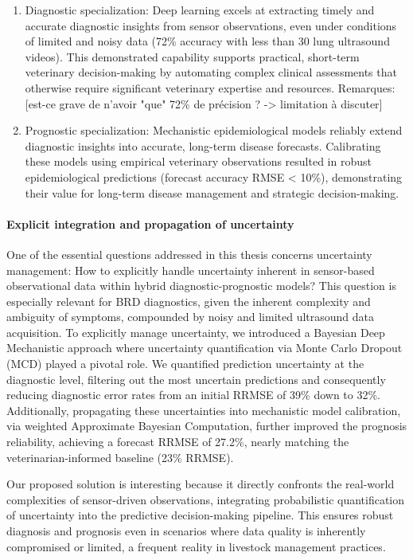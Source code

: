 \begin{enumerate}
    \item Diagnostic specialization: Deep learning excels at extracting timely and accurate diagnostic insights from sensor observations, even under conditions of limited and noisy data (72\% accuracy with less than 30 lung ultrasound videos). This demonstrated capability supports practical, short-term veterinary decision-making by automating complex clinical assessments that otherwise require significant veterinary expertise and resources. Remarques: [est-ce grave de n'avoir "que" 72\% de précision ? -> limitation à discuter]
    
    \item Prognostic specialization: Mechanistic epidemiological models reliably extend diagnostic insights into accurate, long-term disease forecasts. Calibrating these models using empirical veterinary observations resulted in robust epidemiological predictions (forecast accuracy RMSE < 10\%), demonstrating their value for long-term disease management and strategic decision-making.
\end{enumerate}

\paragraph{Explicit integration and propagation of uncertainty} One of the essential questions addressed in this thesis concerns uncertainty management: How to explicitly handle uncertainty inherent in sensor-based observational data within hybrid diagnostic-prognostic models? This question is especially relevant for BRD diagnostics, given the inherent complexity and ambiguity of symptoms, compounded by noisy and limited ultrasound data acquisition.
To explicitly manage uncertainty, we introduced a Bayesian Deep Mechanistic approach where uncertainty quantification via Monte Carlo Dropout (MCD) played a pivotal role. We quantified prediction uncertainty at the diagnostic level, filtering out the most uncertain predictions and consequently reducing diagnostic error rates from an initial RRMSE of 39\% down to 32\%. Additionally, propagating these uncertainties into mechanistic model calibration, via weighted Approximate Bayesian Computation, further improved the prognosis reliability, achieving a forecast RRMSE of 27.2\%, nearly matching the veterinarian-informed baseline (23\% RRMSE).

Our proposed solution is interesting because it directly confronts the real-world complexities of sensor-driven observations, integrating probabilistic quantification of uncertainty into the predictive decision-making pipeline. This ensures robust diagnosis and prognosis even in scenarios where data quality is inherently compromised or limited, a frequent reality in livestock management practices.

